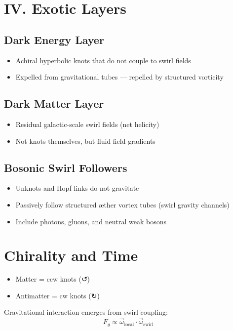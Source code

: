 \documentclass[12pt]{article}
\begin{document}
\section*{IV. Exotic Layers}

\subsection*{Dark Energy Layer}
\begin{itemize}
    \item Achiral hyperbolic knots that do not couple to swirl fields
    \item Expelled from gravitational tubes — repelled by structured vorticity
\end{itemize}

\subsection*{Dark Matter Layer}
\begin{itemize}
    \item Residual galactic-scale swirl fields (net helicity)
    \item Not knots themselves, but fluid field gradients
\end{itemize}

\subsection*{Bosonic Swirl Followers}
\begin{itemize}
    \item Unknots and Hopf links do not gravitate
    \item Passively follow structured æther vortex tubes (swirl gravity channels)
    \item Include photons, gluons, and neutral weak bosons
\end{itemize}

\section*{Chirality and Time}
\begin{itemize}
    \item Matter = ccw knots (↺)
    \item Antimatter = cw knots (↻)
\end{itemize}
Gravitational interaction emerges from swirl coupling:
\[
F_g \propto \vec{\omega}_\text{local} \cdot \vec{\omega}_\text{swirl}
\]
\end{document}
